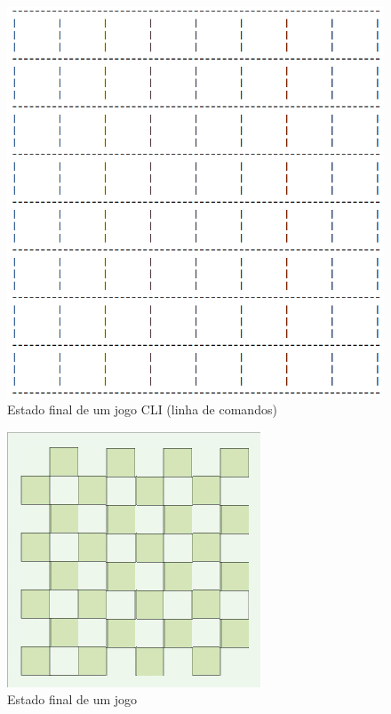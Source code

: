 \documentclass[a4paper,11pt,titlepage]{article}
\begin{document}
\begin{figure}[H]
    \center
    \includegraphics[scale=0.36]{res/final-state-cli.png}
    \caption{Estado final de um jogo CLI (linha de comandos)}
    \label{fig:final-state-cli.png}
\end{figure}

\begin{figure}[H]
    \center
    \includegraphics[scale=0.8]{res/final-state.jpg}
    \caption{Estado final de um jogo}
    \label{final-state.jpg}
\end{figure}
\end{document}
